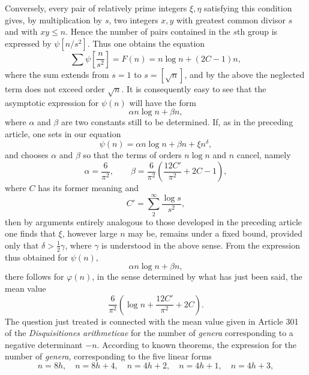 \documentclass[11pt]{article}
\newcommand{\floor}[1]{\left[#1\right]}
\begin{document}
Conversely, every pair of relatively prime integers $\xi,\eta$ satisfying this condition gives, by multiplication by $s$, two integers $x,y$ with greatest common divisor $s$ and with $xy\leq n$. Hence the number of pairs contained in the $s$th group is expressed by $\psi\floor{n/s^2}$. Thus one obtains the equation
\[
 \sum \psi\floor{\frac n{s^2}}=F(n)=n\log n+(2C-1)n,
\]
where the sum extends from $s=1$ to $s=\floor{\sqrt n}$, and by the above the neglected term does not exceed order $\sqrt n$. It is consequently easy to see that the asymptotic expression for $\psi(n)$ will have the form
\[
 \alpha n\log n+\beta n,
\]
where $\alpha$ and $\beta$ are two constants still to be determined. If, as in the preceding article, one sets in our equation
\[
 \psi(n)=\alpha n\log n+\beta n+\xi n^\delta,
\]
and chooses $\alpha$ and $\beta$ so that the terms of orders $n\log n$ and $n$ cancel, namely
\[
 \alpha=\frac6{\pi^2},
 \qquad
 \beta=\frac6{\pi^2}\left(\frac{12C'}{\pi^2}+2C-1\right),
\]
where $C$ has its former meaning and
\[
 C'=\sum_{2}^{\infty}\frac{\log s}{s^2},
\]
then by arguments entirely analogous to those developed in the preceding article one finds that $\xi$, however large $n$ may be, remains under a fixed bound, provided only that $\delta>\frac12\gamma$, where $\gamma$ is understood in the above sense. From the expression thus obtained for $\psi(n)$,
\[
 \alpha n\log n+\beta n,
\]
there follows for $\varphi(n)$, in the sense determined by what has just been said, the mean value
\[
 \frac6{\pi^2}\left(\log n+\frac{12C'}{\pi^2}+2C\right).
\]
The question just treated is connected with the mean value given in Article 301 of the \emph{Disquisitiones arithmeticae} for the number of \emph{genera} corresponding to a negative determinant $-n$. According to known theorems, the expression for the number of \emph{genera}, corresponding to the five linear forms
\[
 n=8h,\quad n=8h+4,\quad n=4h+2,\quad n=4h+1,\quad n=4h+3,
\]
\end{document}
